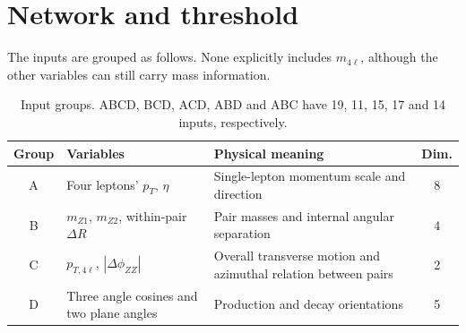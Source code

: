 \documentclass[11pt,a4paper]{article}
\begin{document}
\section{Network and threshold}
The inputs are grouped as follows. None explicitly includes $m_{4\ell}$, although the other variables can still carry mass information.
\begin{table}[H]
\caption{Input groups. ABCD, BCD, ACD, ABD and ABC have 19, 11, 15, 17 and 14 inputs, respectively.}
\label{tab:feature-overview}
\centering\small
\begin{tabularx}{\linewidth}{@{}cp{.36\linewidth}Yc@{}}
\toprule
Group & Variables & Physical meaning & Dim. \\
\midrule
A & Four leptons' $p_T$, $\eta$ & Single-lepton momentum scale and direction & 8 \\
B & $m_{Z1}$, $m_{Z2}$, within-pair $\Delta R$ & Pair masses and internal angular separation & 4 \\
C & $p_{T,4\ell}$, $|\Delta\phi_{ZZ}|$ & Overall transverse motion and azimuthal relation between pairs & 2 \\
D & Three angle cosines and two plane angles & Production and decay orientations & 5 \\
\bottomrule
\end{tabularx}
\end{table}
\end{document}
